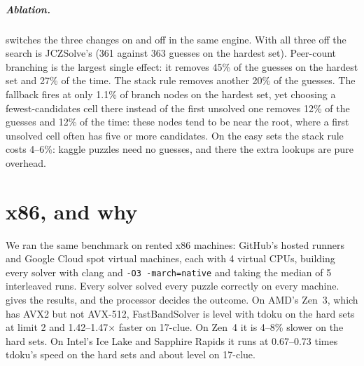 \documentclass[a4paper,USenglish,cleveref,anonymous]{lipics-v2021}
\begin{document}
\subparagraph{Ablation.}  switches the three changes on and off in the same engine. With all three off
the search is JCZSolve's (361 against 363 guesses on the hardest set). Peer-count branching is the largest single
effect: it removes 45\% of the guesses on the hardest set and 27\% of the time. The stack rule removes another 20\% of
the guesses. The fallback fires at only 1.1\% of branch nodes on the hardest set, yet choosing a fewest-candidates cell
there instead of the first unsolved one removes 12\% of the guesses and 12\% of the time: these nodes tend to be near
the root, where a first unsolved cell often has five or more candidates. On the easy sets the stack rule costs
4--6\%: kaggle puzzles need no guesses, and there the extra lookups are pure overhead.

\section{x86, and why}
\label{sec:x86}

We ran the same benchmark on rented x86 machines: GitHub's hosted runners and Google Cloud spot virtual machines, each
with 4 virtual CPUs, building every solver with clang and \texttt{-O3 -march=native} and taking the median of 5
interleaved runs. Every solver solved every puzzle correctly on every machine.  gives the results, and
the processor decides the outcome. On AMD's Zen~3, which has AVX2 but not AVX-512, FastBandSolver is level with tdoku
on the hard sets at limit 2 and 1.42--1.47$\times$ faster on 17-clue. On Zen~4 it is 4--8\% slower on the hard sets.
On Intel's Ice Lake and Sapphire Rapids it runs at 0.67--0.73 times tdoku's speed on the hard sets and about level on
17-clue.
\end{document}
